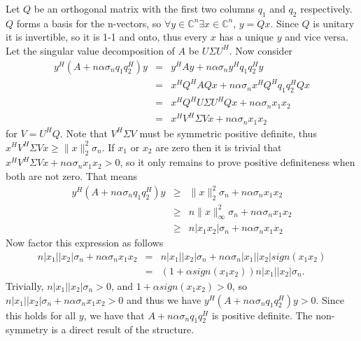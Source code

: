 \Pf
Let $Q$ be an orthogonal matrix with the first two columns $q_1$ and $q_2$ respectively.  $Q$ forms a basis for the n-vectors, so $\forall y\in\mathbb{C}^n \exists x\in\mathbb{C}^n$, $y=Qx$.  Since $Q$ is unitary it is invertible, so it is 1-1 and onto, thus every $x$ has a unique $y$ and vice versa.  Let the singular value decomposition of $A$ be $U\Sigma U^H$.  Now consider
\begin{eqnarray}
y^H(A+n\alpha\sigma_n q_1q_2^H)y
 &=& y^HAy+n\alpha\sigma_n y^Hq_1q_2^Hy\\
 &=& x^HQ^HAQx+n\alpha\sigma_n x^HQ^Hq_1q_2^HQx\\
 &=& x^HQ^HU\Sigma U^HQx+n\alpha\sigma_n x_1x_2\\
 &=& x^HV^H\Sigma Vx+n\alpha\sigma_n x_1x_2
\end{eqnarray}
for $V=U^HQ$.  Note that $V^H\Sigma V$ must be symmetric positive definite, thus $x^HV^H\Sigma Vx\geq\|x\|_2^2\sigma_n$.  If $x_1$ or $x_2$ are zero then it is trivial that $x^HV^H\Sigma Vx+n\alpha\sigma_n x_1x_2>0$, so it only remains to prove positive definiteness when both are not zero.  That means
\begin{eqnarray}
y^H(A+n\alpha\sigma_n q_1q_2^H)y
 &\geq& \|x\|_2^2\sigma_n+n\alpha\sigma_n x_1x_2\\
 &\geq& n\|x\|_\infty^2\sigma_n+n\alpha\sigma_n x_1x_2\\
 &\geq& n|x_1x_2|\sigma_n+n\alpha\sigma_n x_1x_2
\end{eqnarray}
Now factor this expression as follows
\begin{eqnarray}
n|x_1| |x_2|\sigma_n+n\alpha\sigma_n x_1x_2
 &=&n|x_1| |x_2|\sigma_n+n\alpha\sigma_n |x_1| |x_2|sign(x_1x_2)\\
 &=&(1+\alpha sign(x_1x_2))n|x_1| |x_2|\sigma_n.
\end{eqnarray}
Trivially, $n|x_1| |x_2|\sigma_n>0$, and $1+\alpha sign(x_1x_2)>0$, so $n|x_1| |x_2|\sigma_n+n\alpha\sigma_n x_1x_2>0$ and thus we have $y^H(A+n\alpha\sigma_n q_1q_2^H)y>0$. Since this holds for all $y$, we have that $A+n\alpha\sigma_n q_1q_2^H$ is positive definite.  The non-symmetry is a direct result of the structure.
\Pfend




